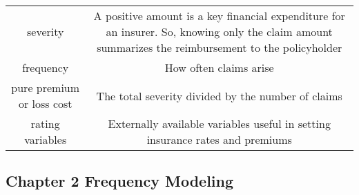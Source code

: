 \documentclass[]{book}
\theoremstyle{definition}
\theoremstyle{definition}
\theoremstyle{definition}
\theoremstyle{remark}
\begin{document}
\begin{longtable}[]{@{}cc@{}}
\begin{minipage}[t]{0.41\columnwidth}
severity\strut
\end{minipage} & \begin{minipage}[t]{0.42\columnwidth}\centering\strut
A positive amount is a key financial expenditure for an insurer. So,
knowing only the claim amount summarizes the reimbursement to the
policyholder\strut
\end{minipage}\tabularnewline
\begin{minipage}[t]{0.41\columnwidth}\centering\strut
frequency\strut
\end{minipage} & \begin{minipage}[t]{0.42\columnwidth}\centering\strut
How often claims arise\strut
\end{minipage}\tabularnewline
\begin{minipage}[t]{0.41\columnwidth}\centering\strut
pure premium or loss cost\strut
\end{minipage} & \begin{minipage}[t]{0.42\columnwidth}\centering\strut
The total severity divided by the number of claims\strut
\end{minipage}\tabularnewline
\begin{minipage}[t]{0.41\columnwidth}\centering\strut
rating variables\strut
\end{minipage} & \begin{minipage}[t]{0.42\columnwidth}\centering\strut
Externally available variables useful in setting insurance rates and
premiums\strut
\end{minipage}\tabularnewline
\bottomrule
\end{longtable}

\subsection{Chapter 2 Frequency
Modeling}\label{chapter-2-frequency-modeling}
\end{document}
